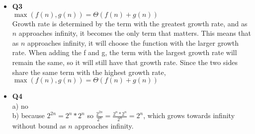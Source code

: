 \documentclass[11pt]{article}
\begin{document}
\begin{itemize}
\item \textbf{Q3} 
\\$\max(f(n),g(n))=\Theta(f(n)+g(n))$
\\Growth rate is determined by the term with the greatest growth rate, and as $n$ approaches infinity, it becomes the only term that matters. This means that as $n$ approaches infinity, it will choose the function with the larger growth rate. When adding the f and g, the term with the largest growth rate will remain the same, so it will still have that growth rate. Since the two sides share the same term with the highest growth rate, $\max(f(n),g(n))=\Theta(f(n)+g(n))$

\vspace{0.1in}

\item \textbf{Q4} 
\\a) no
\\b) because $2^{2n}=2^n*2^n$ so $\frac{2^{2n}}{2^n}=\frac{2^n*2^n}{2^n}=2^n$, which grows towards infinity without bound as $n$ approaches infinity.

\end{itemize}
\end{document}

